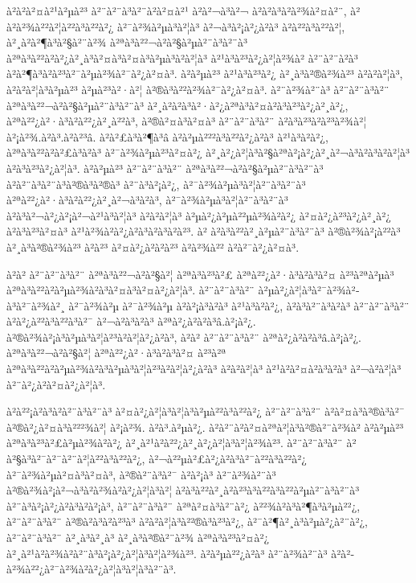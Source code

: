 à²à²à²¤à²¹à²µà²³ à²¨à²¨à³à²¨à²à²¤à²¹ à²à²¬à³à²¬ à²à²à³à²à²¾à²¤à²¨, à² à²à²¾à²²à²¦à²²à³à²²à²¿ à²¯à²¾à²µà³à²¦à³ à²¬à³à²¡à²¿à²à³ à²à²²à³à²²à²¦, à²¸à²à²¶à³à²§à²¨à²¾ à²ªà³à²²¬à²à²§à²µà²¨à³à²¨à³ à²ªà³à²²à²à²¿à²¸à³à²¤à³à²¤à³à²µà³à²à²¦à³ à²¹à³à²³à²¿à²¦à²¾à² à²¨à²¨à²à³ à²à²¶à³à²à²³à²¯à²µà²¾à²¯à²¿à²¤à³. à²à²µà²³ à²¹à³à²³à²¿ à²¸à³à²®à²¾à²³ à²à²à²¦à³, à²à²à²¦à³à²µà²³ à²µà²³à²·à²¦ à²®à³à²²à²¾à²¯à²¿à²¤à³. à²¨à²¾à²¨à³ à²¨à²¨à³à²¨ à²ªà³à²²¬à²à²§à²µà²¨à³à²¨à³ à²¸à²à²à³à²·à²¿à²ªà³à²¤à²à³à²³à²¿à²¸à²¿, à²ªà²²¿à²·à³à²à²²¿à²¸à²²à³, à²®à²¤à³à²¤à³ à²¨à²¨à³à²¨ à²à³à²³à²à²³à²¾à²¦ à²¡à²¾.à²à³.à²à²³â. à²à²£à³à²¶à³â à²à²µà²²²à³à²²à²¿à²à³ à²¹à³à²à²¿, à²ªà³à²²à²à²£à³à²à³ à²¯à²¾à²µà²³à²¤à²¿ à²¸à²¿à²¦à³à²§à²ªà²¡à²¿à²¸à²¬à³à²à³à²à²¦à³ à²à³à²³à²¿à²¦à³. à²à²µà²³ à²¨à²¨à³à²¨ à²ªà³à²²¬à²à²§à²µà²¨à³à²¨à³ à²à²¨à³à²¨à³à²®à³à²®à³ à²¨à³à²¡à²¿, à²¯à²¾à²µà³à²¦à²¨à³à²¨à³ à²ªà²²¿à²·à³à²à²²¿à²¸à²¬à³à²à³, à²¯à²¾à²µà³à²¦à²¨à³à²¨à³ à²à³à²¬à²¿à²¡à²¬à²¹à³à²¦à³ à²à²à²¦à³ à²µà²¿à²µà²²µà²¾à²à²¿ à²¤à²¿à²³à²¿à²¸à²¿ à²à³à²³à²¤à³ à²¹à²¾à²à²¿à²à³à²à³à²à²³. à² à²à³à²²à²¸à²µà²¨à³à²¨à³ à²®à²¾à²¡à²²à³ à²¸à³à²®à²¾à²³ à²à²³ à²¤à²¿à²à²à²³ à²à²¾à²² à²à²¯à²¿à²¤à³. 

à²à² à²¨à²¨à³à²¨ à²ªà³à²²¬à²à²§à²¦ à²ªà³à²³à²£ à²ªà²²¿à²·à³à²à³à²¤ à²³à²ªà²µà³ à²ªà³à²²à²à²µà²¾à²à³à²¤à³à²¤à²¿à²¦à³. à²¨à²¨à³à²¨ à²µà²¿à²¦à³à²¯à²¾à²­à³à²¯à²¾à²¸ à²¯à²¾à²µ à²¯à²¾à²µ à²à²¡à³à²à³ à²¹à³à²à²¿, à²à³à²¨à³à²à³ à²¨à²¨à³à²¨ à²à²¿à²²à³à²²à³à²¯ à²¬à²à³à²à³ à²ªà²¿à²à²à³â.à²¡à²¿. à²®à²¾à²¡à³à²µà³à²¦à²³à²à²¦à²¿à²à³, à²à² à²¨à²¨à³à²¨ à²ªà²¿à²à²à³â.à²¡à²¿. à²ªà³à²²¬à²à²§à²¦ à²ªà²²¿à²·à³à²à³à²¤ à²³à²ª à²ªà³à²²à²à²µà²¾à²à³à²µà³à²¦à²³à²à²¦à²¿à²à³ à²à²à²¦à³ à²¹à²à²¤à²à³à²à³ à²¬à²à²¦à³ à²¨à²¿à²à²¤à²¿à²¦à³. 

à²à²²¡à²à³à²à²¨à³à²¨à³ à²¤à²¿à²¦à³à²¦à³à²µà²²à³à²²à²¿ à²¨à²¨à³à²¨ à²à²¤à³à²®à³à²¯ à²®à²¿à²¤à³à²²²¾à²¦ à²¡à²¾. à²à³.à²µà²¿. à²à²¨à²à²¤à²ªà²¦à³à²®à²¨à²¾à²­ à²à²µà²³ à²ªà³à²³à²£à²µà²¾à²à²¿ à²¸à²¹à²à²²¿à²¸à²¿à²¦à³à²¦à²¾à²³. à²¨à²¨à³à²¨ à²à²§à³à²¯à²¯à²¨à²¦à²²à³à²²à²¿, à²¬à²²µà²£à²¿à²à³à²¯à²²à³à²²à²¿ à²¯à²¾à²µà²¤à³à²¤à³, à²®à²¨à³à²¯ à²à²¡à³ à²¨à²¾à²¨à³ à²®à²¾à²¡à²¬à³à²à²¾à²à²¿à²¦à³à²¦ à²à³à²²à²¸à²à²³à³à²²à³à²²à²µà²¨à³à²¨à³ à²¨à³à²¡à²¿à²à³à²à²¡à³, à²¨à²¨à³à²¨ à²ªà²¤à³à²¨à²¿ à²²¾à²à³à²¶à³à²µà²²¿, à²¨à²¨à³à²¨ à²®à²à³à²à²³à³ à²à²à²¦à³à²²®à³à²³à²¿, à²¯à²¶à²¸à³à²µà²¿à²¨à²¿, à²¨à²¨à³à²¨ à²¸à³à²¸à³ à²¸à³à²®à²¨à²¾ à²ªà³à²³à²¤à²¿ à²¸à²¹à²à²¾à²\circ à²¨à³à²¡à²¿à²¦à³à²¦à²¾à²³. à²à²µà²²¿à²à³ à²¨à²¾à²¨à³ à²à²­à²¾à²²¿à²¯à²¾à²à²¿à²¦à³à²¦à³à²¨à³. 

